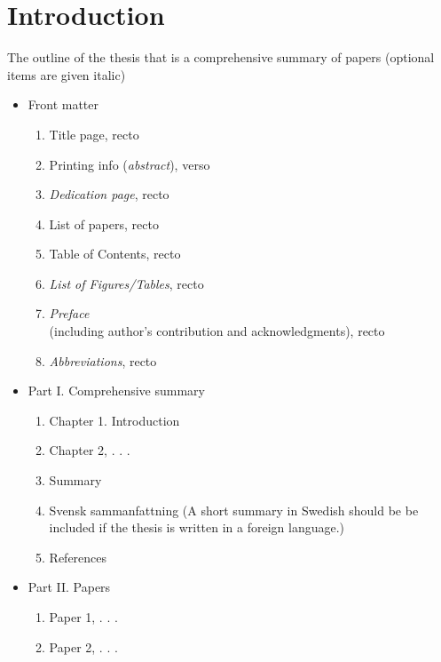 
\chapter{Introduction}

The outline of the thesis that is a comprehensive summary of papers 
(optional items are given italic)

\begin{itemize}

  \item Front matter
  \begin{enumerate}
    \item Title page, recto
    \item Printing info (\emph{abstract}), verso
    \item \emph{Dedication page}, recto
    \item List of papers, recto
    \item Table of Contents, recto
    \item \emph{List of Figures/Tables}, recto
    \item \emph{Preface}\\
    (including author's contribution and
    acknowledgments),
    recto
    \item \emph{Abbreviations}, recto
  \end{enumerate}
  
  \item Part I. Comprehensive summary
    \begin{enumerate}
      \item Chapter 1. Introduction
      \item Chapter 2, . . .
      \item Summary
      \item Svensk sammanfattning 
      (A short summary in Swedish should be be included if the thesis is
      written in a foreign language.)
      \item References
    \end{enumerate}
  \item Part II. Papers
    \begin{enumerate}
      \item Paper 1, . . .
      \item Paper 2, . . .
    \end{enumerate}

\end{itemize}

